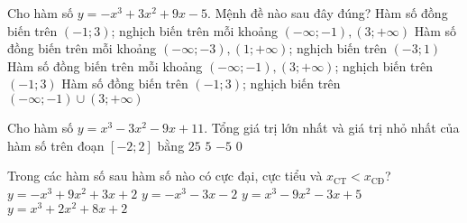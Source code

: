 \begin{ex}%
Cho hàm số $y=-x^3+3x^2+9x-5$. Mệnh đề nào sau đây đúng?
\choice
{\True Hàm số đồng biến trên $\left( -1;3 \right)$; nghịch biến trên mỗi khoảng $\left( -\infty ;-1 \right),\left( 3;+\infty  \right)$}
{Hàm số đồng biến trên mỗi khoảng $\left( -\infty ;-3 \right),\left( 1;+\infty  \right)$; nghịch biến trên $\left( -3;1 \right)$}
{Hàm số đồng biến trên mỗi khoảng $\left( -\infty ;-1 \right),\left( 3;+\infty  \right)$; nghịch biến trên $\left( -1;3 \right)$}
{Hàm số đồng biến trên $\left( -1;3 \right)$; nghịch biến trên $\left( -\infty ;-1 \right)\cup \left( 3;+\infty  \right)$}
\end{ex}
\begin{ex}%
Cho hàm số $y=x^3-3x^2-9x+11$. Tổng giá trị lớn nhất và giá trị nhỏ nhất của hàm số trên đoạn $\left[-2;2\right]$ bằng
\choice
{$25$}
{\True $5$}
{$-5$}
{$0$}
\end{ex}
\begin{ex}%
Trong các hàm số sau hàm số nào có cực đại, cực tiểu và $x_{\text{CT}}<x_{\text{CĐ}}$?
\choice
{\True $y=-x^3+9x^2+3x+2$}
{$y=-x^3-3x-2$}
{$y=x^3-9x^2-3x+5$}
{$y=x^3+2x^2+8x+2$}
\end{ex}
